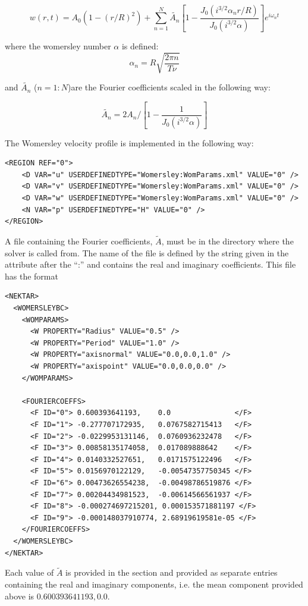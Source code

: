$$ w(r,t) = A_0(1-(r/R)^2) + \sum_{n=1}^N
\tilde{A_n}[1-\frac{J_0(i^{3/2}\alpha_n r/R)}{J_0(i^{3/2}
    \alpha)}]e^{i\omega_n t} $$

where the womersley number $\alpha$ is defined:
$$ \alpha_n = R\sqrt{\frac{2\pi n}{T\nu}}$$

and $\tilde{A_n}$ ($n=1:N$)are the Fourier coefficients scaled in the
following way:

$$ \tilde{A_n} = 2A_n/[1 - \frac{1}{J_0(i^{3/2}\alpha)}] $$

The Womersley velocity profile is implemented in the following way:

\begin{lstlisting}[style=XMLStyle]
<REGION REF="0">
    <D VAR="u" USERDEFINEDTYPE="Womersley:WomParams.xml" VALUE="0" />
    <D VAR="v" USERDEFINEDTYPE="Womersley:WomParams.xml" VALUE="0" />
    <D VAR="w" USERDEFINEDTYPE="Womersley:WomParams.xml" VALUE="0" />
    <N VAR="p" USERDEFINEDTYPE="H" VALUE="0" />
</REGION>
\end{lstlisting}

A file containing the Fourier coefficients, $\tilde{A}$, must be in
the directory where the solver is called from. The name of the file is
defined by the string given in the attribute 
after the ``:'' and contains the real and imaginary coefficients. This
file has the format
\begin{lstlisting}[style=XMLStyle]
<NEKTAR>
  <WOMERSLEYBC>
    <WOMPARAMS>
      <W PROPERTY="Radius" VALUE="0.5" />
      <W PROPERTY="Period" VALUE="1.0" />
      <W PROPERTY="axisnormal" VALUE="0.0,0.0,1.0" />
      <W PROPERTY="axispoint" VALUE="0.0,0.0,0.0" />
    </WOMPARAMS>

    <FOURIERCOEFFS>
      <F ID="0"> 0.600393641193,    0.0               </F>
      <F ID="1"> -0.277707172935,   0.0767582715413   </F>
      <F ID="2"> -0.0229953131146,  0.0760936232478   </F>
      <F ID="3"> 0.00858135174058,  0.017089888642    </F>
      <F ID="4"> 0.0140332527651,   0.0171575122496   </F>
      <F ID="5"> 0.0156970122129,   -0.00547357750345 </F>
      <F ID="6"> 0.00473626554238,  -0.00498786519876 </F>
      <F ID="7"> 0.00204434981523,  -0.00614566561937 </F>
      <F ID="8"> -0.000274697215201, 0.000153571881197 </F>
      <F ID="9"> -0.000148037910774, 2.68919619581e-05 </F>
    </FOURIERCOEFFS>
  </WOMERSLEYBC>
</NEKTAR>
\end{lstlisting}

Each value of $\tilde{A}$ is provided in the 
section and provided as separate entries containing the real and
imaginary components, i.e. the mean component provided above is
$0.600393641193,0.0$.

